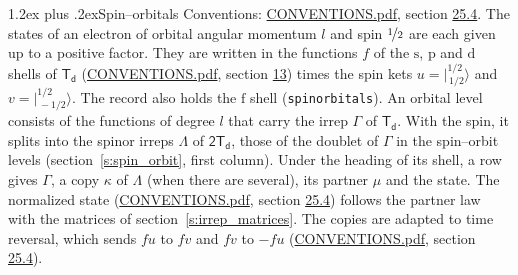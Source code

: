 \documentclass[10pt,a4paper]{article}
\makeatletter
\renewcommand\section{\@startsection{section}{1}{\z@}{-3ex plus -1ex minus -.2ex}%
  {1.2ex plus .2ex}{\normalfont\large\sffamily\bfseries\color{parttitle}}}
\numberwithin{equation}{section}
\newcommand{\grp}[1]{\mathsf{#1}}
\newcommand{\orbital}[1]{\mathrm{#1}}
\newcommand{\mult}{\kappa}
\newcommand{\intx}{\mu}
\newcommand{\jm}[2]{\bigl\lvert{}^{#1}_{\,#2}\bigr\rangle}
\makeatother
\begin{document}
\section{Spin--orbitals}\label{s:spin_orbitals}
Conventions: \href{../../CONVENTIONS.pdf}{CONVENTIONS.pdf}, section \href{../../CONVENTIONS.pdf\#conv.25.4}{25.4}.
\leavevmode\label{n:index.orbital.l}The states of an electron of orbital angular momentum $l$ and spin $\nicefrac{1}{2}$ are each given up to a positive factor. \label{n:local.spinor.uv}\label{n:local.function.f}They are written in the functions $f$ of the $\orbital{s}$, $\orbital{p}$ and $\orbital{d}$ shells of \href{../../../rotation/data/pdf/Td.pdf}{$\grp{T_{d}}$} (\href{../../CONVENTIONS.pdf}{CONVENTIONS.pdf}, section \href{../../../rotation/CONVENTIONS.pdf\#conv.13}{13}) times the spin kets $u = \jm{1/2}{1/2}$ and $v = \jm{1/2}{-1/2}$. The record also holds the $\orbital{f}$ shell (\texttt{spinorbitals}). An orbital level consists of the functions of degree $l$ that carry the irrep $\Gamma$ of \href{../../../rotation/data/pdf/Td.pdf}{$\grp{T_{d}}$}. With the spin, it splits into the spinor irreps $\Lambda$ of $\grp{2T_{d}}$, those of the doublet of $\Gamma$ in the spin--orbit levels (section~\ref{s:spin_orbit}, first column). \label{n:head.state}Under the heading of its shell, a row gives $\Gamma$, a copy $\mult$ of $\Lambda$ (when there are several), its partner $\intx$ and the state. The normalized state (\href{../../CONVENTIONS.pdf}{CONVENTIONS.pdf}, section \href{../../CONVENTIONS.pdf\#conv.25.4}{25.4}) follows the partner law with the matrices of section~\ref{s:irrep_matrices}. The copies are adapted to time reversal, which sends $f u$ to $f v$ and $f v$ to $-f u$ (\href{../../CONVENTIONS.pdf}{CONVENTIONS.pdf}, section \href{../../CONVENTIONS.pdf\#conv.25.4}{25.4}).
\end{document}
